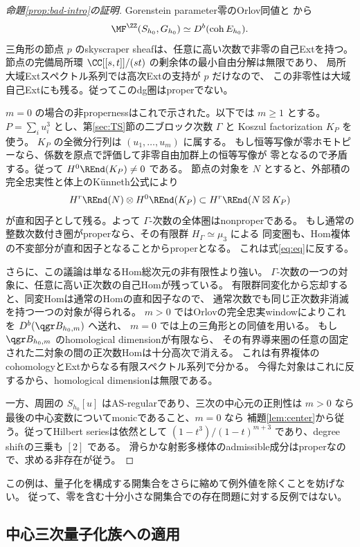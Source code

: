 \begin{proof}[命題\ref{prop:bad-intro}の証明]
 Gorenstein parameter零のOrlov同値と \cite[Theorem 5.8]{CCKM}から
 \[
 \MF^\ZZ(S_{h_0},G_{h_0})\simeq D^b(\operatorname{coh}E_{h_0}).
 \]
 三角形の節点 \(p\) のskyscraper sheafは、任意に高い次数で非零の自己Extを持つ。
 節点の完備局所環 \(\CC[[s,t]]/(st)\) の剰余体の最小自由分解は無限であり、
 局所大域Extスペクトル系列では高次Extの支持が \(p\) だけなので、
 この非零性は大域自己Extにも残る。従ってこのdg圏はproperでない。

 \(m=0\) の場合の非propernessはこれで示された。以下では \(m\ge1\) とする。
 \(P=\sum_i u_i^3\) とし、第\ref{sec:TS}節の二ブロック次数 \(\Gamma\) と
 Koszul factorization \(K_P\) を使う。
 \(K_P\) の全微分行列は \((u_1,\ldots,u_m)\) に属する。
 もし恒等写像が零ホモトピーなら、係数を原点で評価して非零自由加群上の恒等写像が
 零となるので矛盾する。従って \(H^0\REnd(K_P)\ne0\) である。
 節点の対象を \(N\) とすると、外部積の完全忠実性と体上のKünneth公式により
 \[
 H^r\REnd(N)\otimes H^0\REnd(K_P)
 \subset H^r\REnd(N\boxtimes K_P)
 \]
 が直和因子として残る。よって \(\Gamma\)-次数の全体圏はnonproperである。
 もし通常の整数次数付き圏がproperなら、その有限群 \(H_\Gamma\simeq\mu_3\) による
 同変圏も、Hom複体の不変部分が直和因子となることからproperとなる。
 これは式\eqref{eq:eq}に反する。

 さらに、この議論は単なるHom総次元の非有限性より強い。
 \(\Gamma\)-次数の一つの対象に、任意に高い正次数の自己Homが残っている。
 有限群同変化から忘却すると、同変Homは通常のHomの直和因子なので、
 通常次数でも同じ正次数非消滅を持つ一つの対象が得られる。
 \(m>0\) ではOrlovの完全忠実windowによりこれを \(D^b(\qgr B_{h_0,m})\) へ送れ、
 \(m=0\) では上の三角形との同値を用いる。
 もし \(\qgr B_{h_0,m}\) のhomological dimensionが有限なら、
 その有界導来圏の任意の固定された二対象の間の正次数Homは十分高次で消える。
 これは有界複体のcohomologyとExtからなる有限スペクトル系列で分かる。
 今得た対象はこれに反するから、homological dimensionは無限である。

 一方、周囲の \(S_{h_0}[u]\) はAS-regularであり、三次の中心元の正則性は
 \(m>0\) なら最後の中心変数についてmonicであること、\(m=0\) なら
 補題\ref{lem:center}から従う。従ってHilbert seriesは依然として
 \((1-t^3)/(1-t)^{m+3}\) であり、degree shiftの三乗も \([2]\) である。
 滑らかな射影多様体のadmissible成分はproperなので、求める非存在が従う。
\end{proof}

この例は、量子化を構成する開集合をさらに縮めて例外値を除くことを妨げない。
従って、零を含む十分小さな開集合での存在問題に対する反例ではない。

\subsection{中心三次量子化族への適用}

